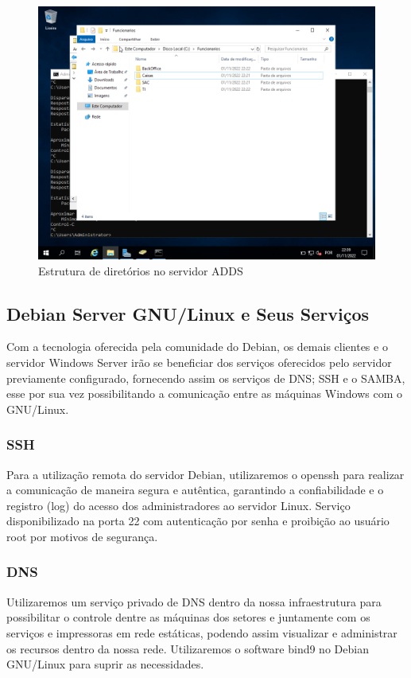 \documentclass[12pt]{article}
\begin{document}
\begin{figure}[ht]
\centering
\includegraphics[height=0.5\textwidth]{adds-pasta-compartilhada.png}
\caption{Estrutura de diretórios no servidor ADDS}
\label{fig:adds-pastas}
\end{figure}

\newpage

\subsection{Debian Server GNU/Linux e Seus Serviços}
Com a tecnologia oferecida pela comunidade do Debian, os demais clientes e o servidor Windows Server irão se beneficiar dos serviços oferecidos pelo servidor previamente configurado, fornecendo assim os serviços de DNS; SSH e o SAMBA, esse por sua vez possibilitando a comunicação entre as máquinas Windows com o GNU/Linux.

\subsubsection{SSH}
Para a utilização remota do servidor Debian, utilizaremos o openssh para realizar a comunicação de maneira segura e autêntica, garantindo a confiabilidade e o registro (log) do acesso dos administradores ao servidor Linux. Serviço disponibilizado na porta 22 com autenticação por senha e proibição ao usuário root por motivos de segurança.

\subsubsection{DNS}
Utilizaremos um serviço privado de DNS dentro da nossa infraestrutura para possibilitar o controle dentre as máquinas dos setores e juntamente com os serviços e impressoras em rede estáticas, podendo assim visualizar e administrar os recursos dentro da nossa rede. Utilizaremos o software bind9 no Debian GNU/Linux para suprir as necessidades.
\end{document}
